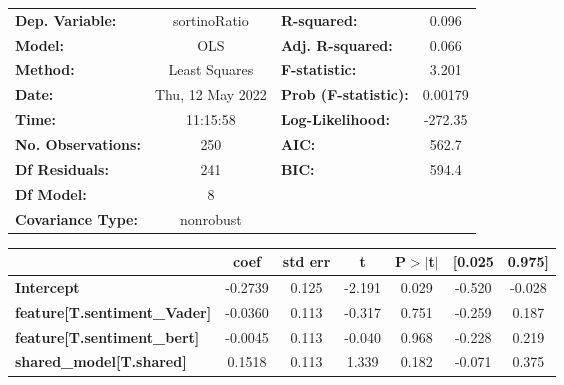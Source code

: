\begin{center}
\begin{tabular}{lclc}
\toprule
\textbf{Dep. Variable:}                       &   sortinoRatio   & \textbf{  R-squared:         } &     0.096   \\
\textbf{Model:}                               &       OLS        & \textbf{  Adj. R-squared:    } &     0.066   \\
\textbf{Method:}                              &  Least Squares   & \textbf{  F-statistic:       } &     3.201   \\
\textbf{Date:}                                & Thu, 12 May 2022 & \textbf{  Prob (F-statistic):} &  0.00179    \\
\textbf{Time:}                                &     11:15:58     & \textbf{  Log-Likelihood:    } &   -272.35   \\
\textbf{No. Observations:}                    &         250      & \textbf{  AIC:               } &     562.7   \\
\textbf{Df Residuals:}                        &         241      & \textbf{  BIC:               } &     594.4   \\
\textbf{Df Model:}                            &           8      & \textbf{                     } &             \\
\textbf{Covariance Type:}                     &    nonrobust     & \textbf{                     } &             \\
\bottomrule
\end{tabular}
\begin{tabular}{lcccccc}
                                              & \textbf{coef} & \textbf{std err} & \textbf{t} & \textbf{P$> |$t$|$} & \textbf{[0.025} & \textbf{0.975]}  \\
\midrule
\textbf{Intercept}                            &      -0.2739  &        0.125     &    -2.191  &         0.029        &       -0.520    &       -0.028     \\
\textbf{feature[T.sentiment\_Vader]}          &      -0.0360  &        0.113     &    -0.317  &         0.751        &       -0.259    &        0.187     \\
\textbf{feature[T.sentiment\_bert]}           &      -0.0045  &        0.113     &    -0.040  &         0.968        &       -0.228    &        0.219     \\
\textbf{shared\_model[T.shared]}              &       0.1518  &        0.113     &     1.339  &         0.182        &       -0.071    &        0.375     \\

\end{tabular}
\end{center}
